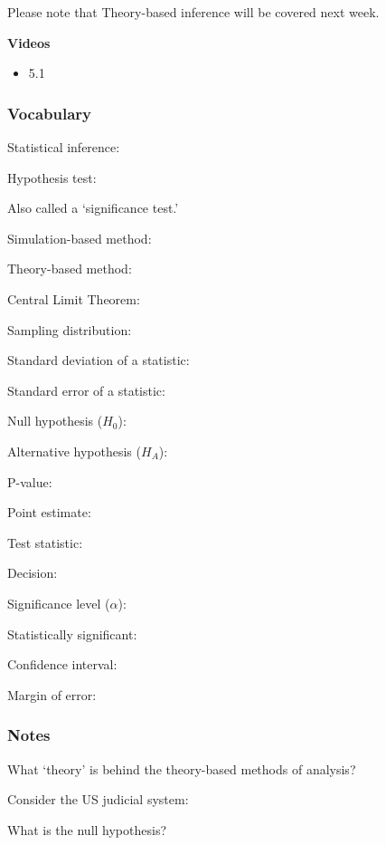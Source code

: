 \documentclass[
]{report}
\providecommand{\tightlist}{%
  \setlength{\itemsep}{0pt}\setlength{\parskip}{0pt}}
\newcommand{\rgs}{\vspace{12pt}} %
\newcommand{\rgi}{\hspace{24pt}}  %
\begin{document}
Please note that Theory-based inference will be covered next week.

\textbf{Videos}

\begin{itemize}
\tightlist
\item
  5.1
\end{itemize}


\hypertarget{vocabulary-10}{%
\subsubsection*{Vocabulary}\label{vocabulary-10}}

Statistical inference:
\rgs

Hypothesis test:

\rgi Also called a `significance test.'
\rgs

Simulation-based method:
\rgs

Theory-based method:
\rgs

Central Limit Theorem:
\rgs

Sampling distribution:
\rgs

Standard deviation of a statistic:
\rgs

Standard error of a statistic:
\rgs

Null hypothesis (\(H_0\)):
\rgs

Alternative hypothesis (\(H_A\)):
\rgs

P-value:
\rgs

Point estimate:
\rgs

Test statistic:
\rgs

Decision:
\rgs

Significance level (\(\alpha\)):
\rgs 

Statistically significant:
\rgs

Confidence interval:
\rgs

Margin of error:
\rgs

\hypertarget{notes-15}{%
\subsubsection*{Notes}\label{notes-15}}

What `theory' is behind the theory-based methods of analysis?
\rgs

Consider the US judicial system:

\rgi What is the null hypothesis?
\rgs
\end{document}
